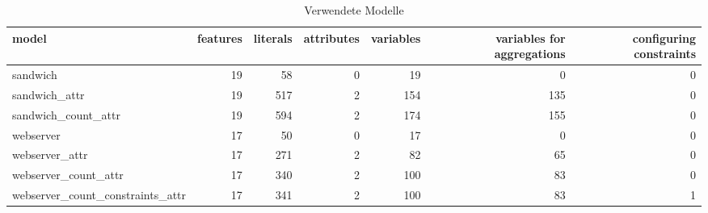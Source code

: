 \begin{table}
\centering
\caption{Verwendete Modelle}
\begin{tabular}{lrrrrrr}
\toprule
                           model &  features &  literals &  attributes &  variables &  variables for aggregations &  configuring constraints \\
\midrule
                        sandwich &        19 &        58 &           0 &         19 &                           0 &                        0 \\
                   sandwich\_attr &        19 &       517 &           2 &        154 &                         135 &                        0 \\
             sandwich\_count\_attr &        19 &       594 &           2 &        174 &                         155 &                        0 \\
                       webserver &        17 &        50 &           0 &         17 &                           0 &                        0 \\
                  webserver\_attr &        17 &       271 &           2 &         82 &                          65 &                        0 \\
            webserver\_count\_attr &        17 &       340 &           2 &        100 &                          83 &                        0 \\
webserver\_count\_constraints\_attr &        17 &       341 &           2 &        100 &                          83 &                        1 \\
\bottomrule
\end{tabular}
\end{table}

